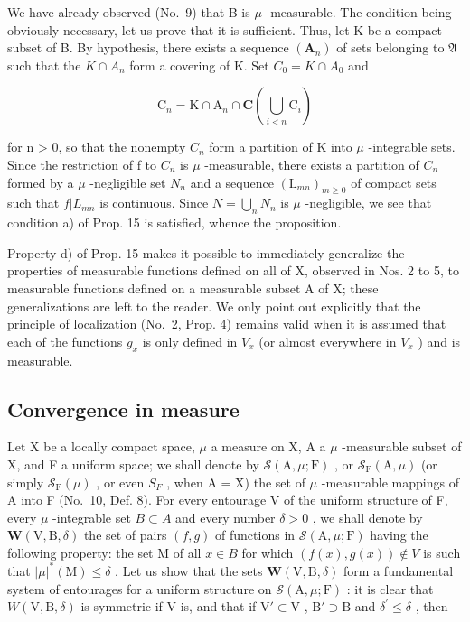 We have already observed (No.~9) that B is \(\mu\) -measurable. The condition being obviously necessary, let us prove that it is sufficient. Thus, let K be a compact subset of B. By hypothesis, there exists a sequence \((\mathbf{A}_{n})\) of sets belonging to \(\mathfrak{A}\) such that the \(K \cap A_{n}\) form a covering of K. Set \(C_{0} = K \cap A_{0}\) and

\[
\mathrm{C} _ {n} = \mathrm{K} \cap \mathrm{A} _ {n} \cap \mathbf {C} \left(\bigcup_ {i <   n} \mathrm{C} _ {i}\right)
\]

for n \textgreater{} 0, so that the nonempty \(C_{n}\) form a partition of K into \(\mu\) -integrable sets. Since the restriction of f to \(C_{n}\) is \(\mu\) -measurable, there exists a partition of \(C_{n}\) formed by a \(\mu\) -negligible set \(N_{n}\) and a sequence \((\mathrm{L}_{mn})_{m \geqslant 0}\) of compact sets such that \(f|L_{mn}\) is continuous. Since \(N = \bigcup_{n} N_{n}\) is \(\mu\) -negligible, we see that condition a) of Prop. 15 is satisfied, whence the proposition.

Property d) of Prop. 15 makes it possible to immediately generalize the properties of measurable functions defined on all of X, observed in Nos. 2 to 5, to measurable functions defined on a measurable subset A of X; these generalizations are left to the reader. We only point out explicitly that the principle of localization (No.~2, Prop. 4) remains valid when it is assumed that each of the functions \(g_{x}\) is only defined in \(V_{x}\) (or almost everywhere in \(V_{x}\) ) and is measurable.

\subsection{Convergence in measure}

Let X be a locally compact space, \(\mu\) a measure on X, A a \(\mu\) -measurable subset of X, and F a uniform space; we shall denote by \(\mathcal{S}(\mathrm{A},\mu;\mathrm{F})\) , or \(\mathcal{S}_{\mathrm{F}}(\mathrm{A},\mu)\) (or simply \(\mathcal{S}_{\mathrm{F}}(\mu)\) , or even \(S_{F}\) , when A = X) the set of \(\mu\) -measurable mappings of A into F (No.~10, Def. 8). For every entourage V of the uniform structure of F, every \(\mu\) -integrable set \(B \subset A\) and every number \(\delta > 0\) , we shall denote by \(\boldsymbol{W}(\mathrm{V},\mathrm{B},\delta)\) the set of pairs \((f,g)\) of functions in \(\mathcal{S}(\mathrm{A},\mu;\mathrm{F})\) having the following property: the set M of all \(x \in B\) for which \((f(x),g(x)) \notin V\) is such that \(|\mu|^{*}(\mathrm{M}) \leqslant \delta\) . Let us show that the sets \(\boldsymbol{W}(\mathrm{V},\mathrm{B},\delta)\) form a fundamental system of entourages for a uniform structure on \(\mathcal{S}(\mathrm{A},\mu ;\mathrm{F})\) : it is clear that \(W(\mathrm{V},\mathrm{B},\delta)\) is symmetric if V is, and that if \(\mathrm{V}'\subset \mathrm{V}\) , \(\mathrm{B}'\supset \mathrm{B}\) and \(\delta^{\prime}\leqslant \delta\) , then


